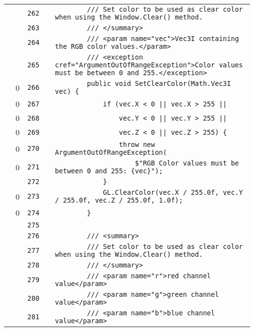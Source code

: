 \documentclass[a4paper,landscape,10pt]{article}
\begin{document}
\begin{longtable}[l]{lrrll}
\cellcolor{gray} &  & \verb~262~ & & \verb~        /// Set color to be used as clear color when using the Window.Clear() method.~\\
\cellcolor{gray} &  & \verb~263~ & & \verb~        /// </summary>~\\
\cellcolor{gray} &  & \verb~264~ & & \verb~        /// <param name="vec">Vec3I containing the RGB color values.</param>~\\
\cellcolor{gray} &  & \verb~265~ & & \verb~        /// <exception cref="ArgumentOutOfRangeException">Color values must be between 0 and 255.</exception>~\\
\cellcolor{red} & 0 & \verb~266~ & & \verb~        public void SetClearColor(Math.Vec3I vec) {~\\
\cellcolor{red} & 0 & \verb~267~ & & \verb~            if (vec.X < 0 || vec.X > 255 ||~\\
\cellcolor{red} & 0 & \verb~268~ & & \verb~                vec.Y < 0 || vec.Y > 255 ||~\\
\cellcolor{red} & 0 & \verb~269~ & & \verb~                vec.Z < 0 || vec.Z > 255) {~\\
\cellcolor{red} & 0 & \verb~270~ & & \verb~                throw new ArgumentOutOfRangeException(~\\
\cellcolor{red} & 0 & \verb~271~ & & \verb~                    $"RGB Color values must be between 0 and 255: {vec}");~\\
\cellcolor{gray} &  & \verb~272~ & & \verb~            }~\\
\cellcolor{red} & 0 & \verb~273~ & & \verb~            GL.ClearColor(vec.X / 255.0f, vec.Y / 255.0f, vec.Z / 255.0f, 1.0f);~\\
\cellcolor{red} & 0 & \verb~274~ & & \verb~        }~\\
\cellcolor{gray} &  & \verb~275~ & & \verb~~\\
\cellcolor{gray} &  & \verb~276~ & & \verb~        /// <summary>~\\
\cellcolor{gray} &  & \verb~277~ & & \verb~        /// Set color to be used as clear color when using the Window.Clear() method.~\\
\cellcolor{gray} &  & \verb~278~ & & \verb~        /// </summary>~\\
\cellcolor{gray} &  & \verb~279~ & & \verb~        /// <param name="r">red channel value</param>~\\
\cellcolor{gray} &  & \verb~280~ & & \verb~        /// <param name="g">green channel value</param>~\\
\cellcolor{gray} &  & \verb~281~ & & \verb~        /// <param name="b">blue channel value</param>~\\

\end{longtable}
\end{document}
